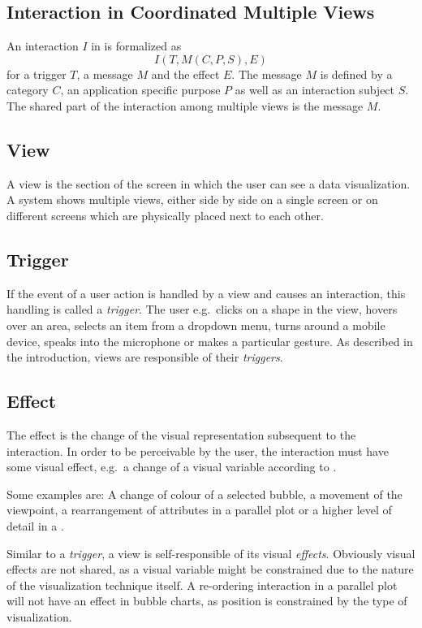 \subsection{Interaction in Coordinated Multiple Views}\label{sec:concept:framework:interaction}
An interaction $I$ in \cmvs{} is formalized as
\begin{equation}
  I(T, M(C,P,S), E)
\end{equation}
for a trigger $T$, a message $M$ and the effect $E$.
The message $M$ is defined by a category $C$, an application specific purpose $P$ as well as an interaction subject $S$.
The shared part of the interaction among multiple views is the message $M$.

\subsection{View}
A view is the section of the screen in which the user can see a data visualization.
A \cmv{} system shows multiple views, either side by side on a single screen or on different screens which are physically placed next to each other.


\subsection{Trigger}
If the event of a user action is handled by a view and causes an interaction, this handling is called a \emph{trigger}.
The user e.g.\ clicks on a shape in the view, hovers over an area, selects an item from a dropdown menu, turns around a mobile device, speaks into the microphone or makes a particular gesture.
As described in the introduction, views are responsible of their \emph{triggers}.


\subsection{Effect}
The effect is the change of the visual representation subsequent to the interaction.
In order to be perceivable by the user, the interaction must have some visual effect, e.g.\ a change of a visual variable according to \textcite{Bertin2010}.

Some examples are:
A change of colour of a selected bubble, a movement of the viewpoint, a rearrangement of attributes in a parallel plot or a higher level of detail in a \tmap{}.

Similar to a \emph{trigger}, a view is self-responsible of its visual \emph{effects}.
Obviously visual effects are not shared, as a visual variable might be constrained due to the nature of the visualization technique itself.
A re-ordering interaction in a parallel plot will not have an effect in bubble charts, as position is constrained by the type of visualization.

